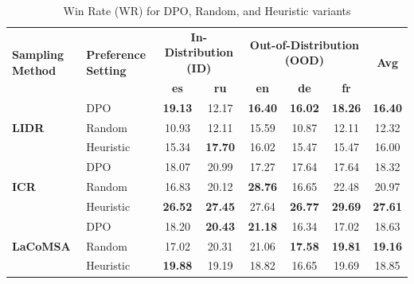 \begin{table}[t]
\centering
\scriptsize
\setlength{\tabcolsep}{6pt}
\renewcommand{\arraystretch}{1.15}
\begin{tabular}{ll|cc|ccc|c}
\toprule
\multirow{2}{*}{\textbf{Sampling Method}} & \multirow{2}{*}{\textbf{Preference Setting}} & \multicolumn{2}{c|}{\textbf{In-Distribution (ID)}} & \multicolumn{3}{c|}{\textbf{Out-of-Distribution (OOD)}} & \multirow{2}{*}{\textbf{Avg}} \\
 &  & \textbf{es} & \textbf{ru} & \textbf{en} & \textbf{de} & \textbf{fr} &  \\
\midrule
\multirow{3}{*}{\textbf{LIDR}} & DPO & \textbf{19.13} & 12.17 & \textbf{16.40} & \textbf{16.02} & \textbf{18.26} & \textbf{16.40} \\
 & Random & 10.93 & 12.11 & 15.59 & 10.87 & 12.11 & 12.32 \\
 & Heuristic & 15.34 & \textbf{17.70} & 16.02 & 15.47 & 15.47 & 16.00 \\
\midrule
\multirow{3}{*}{\textbf{ICR}} & DPO & 18.07 & 20.99 & 17.27 & 17.64 & 17.64 & 18.32 \\
 & Random & 16.83 & 20.12 & \textbf{28.76} & 16.65 & 22.48 & 20.97 \\
 & Heuristic & \textbf{26.52} & \textbf{27.45} & 27.64 & \textbf{26.77} & \textbf{29.69} & \textbf{27.61} \\
\midrule
\multirow{3}{*}{\textbf{LaCoMSA}} & DPO & 18.20 & \textbf{20.43} & \textbf{21.18} & 16.34 & 17.02 & 18.63 \\
 & Random & 17.02 & 20.31 & 21.06 & \textbf{17.58} & \textbf{19.81} & \textbf{19.16} \\
 & Heuristic & \textbf{19.88} & 19.19 & 18.82 & 16.65 & 19.69 & 18.85 \\
\bottomrule
\end{tabular}
\caption{Win Rate (WR) for DPO, Random, and Heuristic variants}
\label{tab:methods_comparison_random_heuristic_wr}
\end{table}
